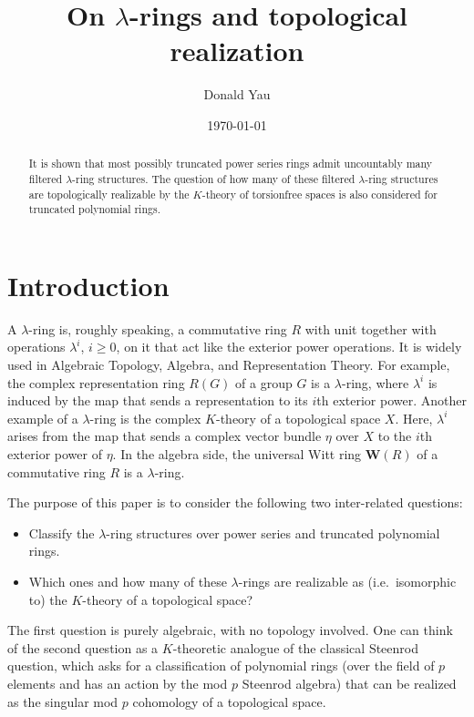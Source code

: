 \documentclass[reqno,11pt]{amsart}
\numberwithin{equation}{subsection}  %
\newcommand{\sqsp}{\renewcommand{\baselinestretch}{1.09}\tiny\normalsize}
\begin{document}
\title{On $\lambda$-rings and topological realization}
\author{Donald Yau}

\begin{abstract}
It is shown that most possibly truncated power series rings admit uncountably many filtered $\lambda$-ring structures.  The question of how many of these filtered $\lambda$-ring structures are topologically realizable by the $K$-theory of torsionfree spaces is also considered for truncated polynomial rings. 
\end{abstract}
\address{Department of Mathematics, University of Illinois at Urbana-Champaign, 1409 W. Green Street, Urbana, IL 61801}
\date{\today}
\maketitle
\sqsp



\section{Introduction}

A $\lambda$-ring is, roughly speaking, a commutative ring $R$ with unit together with operations $\lambda^i$, $i \geq 0$, on it that act like the exterior power operations.  It is widely used in Algebraic Topology, Algebra, and Representation Theory.  For example, the complex representation ring $R(G)$ of a group $G$ is a $\lambda$-ring, where $\lambda^i$ is induced by the map that sends a representation to its $i$th exterior power.  Another example of a $\lambda$-ring is the complex $K$-theory of a topological space $X$.  Here, $\lambda^i$ arises from the map that sends a complex vector bundle $\eta$ over $X$ to the $i$th exterior power of $\eta$.  In the algebra side, the universal Witt ring $\mathbf{W}(R)$ of a commutative ring $R$ is a $\lambda$-ring.


The purpose of this paper is to consider the following two inter-related questions:
   \begin{itemize}
   \item Classify the $\lambda$-ring structures over power series and truncated polynomial rings.
   \item Which ones and how many of these $\lambda$-rings are realizable as (i.e.\ isomorphic to) the $K$-theory of a topological space?
   \end{itemize}
The first question is purely algebraic, with no topology involved.  One can think of the second question as a $K$-theoretic analogue of the classical Steenrod question, which asks for a classification of polynomial rings (over the field of $p$ elements and has an action by the mod $p$ Steenrod algebra) that can be realized as the singular mod $p$ cohomology of a topological space.
\end{document}
